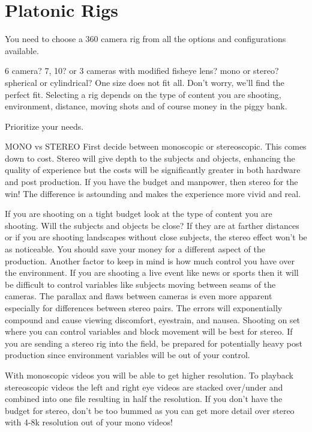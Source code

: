 \chapter{ Platonic Rigs}
\pagecolor{white}
\label{chap:2}
\begin{fullwidth}

\problem

{\large You need to choose a 360 camera rig from all the options and configurations available.
 \par}

6 camera? 7, 10? or 3 cameras with modified fisheye lens? mono or stereo? spherical or cylindrical? One size does not fit all. Don’t worry, we’ll find the perfect fit. Selecting a rig depends on the type of content you are shooting, environment, distance, moving shots and of course money in the piggy bank.

\solution

{\large Prioritize your needs.
 \par}

MONO vs STEREO
First decide between monoscopic or stereoscopic. This comes down to cost. Stereo will give depth to the subjects and objects, enhancing the quality of experience but the costs will be significantly greater in both hardware and post production. If you have the budget and manpower, then stereo for the win! The difference is astounding and makes the experience more vivid and real. 

If you are shooting on a tight budget look at the type of content you are shooting. Will the subjects and objects be close? If they are at farther distances or if you are shooting landscapes without close subjects, the stereo effect won’t be as noticeable. You should save your money for a different aspect of the production. Another factor to keep in mind is how much control you have over the environment. If you are shooting a live event like news or sports then it will be difficult to control variables like subjects moving between seams of the cameras. The parallax and flaws between cameras is even more apparent especially for differences between stereo pairs. The errors will exponentially compound and cause viewing discomfort, eyestrain, and nausea. Shooting on set where you can control variables and block movement will be best for stereo. If you are sending a stereo rig into the field, be prepared for potentially heavy post production since environment variables will be out of your control. 

With monoscopic videos you will be able to get higher resolution. To playback stereoscopic videos the left and right eye videos are stacked over/under and combined into one file resulting in half the resolution. If you don’t have the budget for stereo, don’t be too bummed as you can get more detail over stereo with 4-8k resolution out of your mono videos!


\end{fullwidth}
